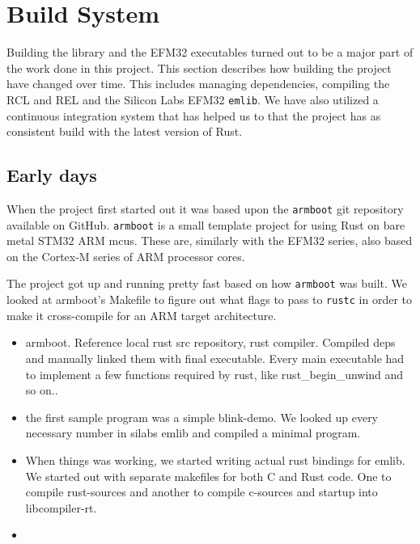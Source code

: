 \section{Build System}
\label{sec:build_system}

Building the library and the EFM32 executables turned out to be a major part of the work done in this project.
This section describes how building the project have changed over time.
This includes managing dependencies, compiling the RCL and REL and the Silicon Labs EFM32 \texttt{emlib}.
We have also utilized a continuous integration system that has helped us to that the project has as consistent build with the latest version of Rust.

\subsection{Early days}
\label{ssub:using_make}

When the project first started out it was based upon the \texttt{armboot} \cite{web:neykov_armboot} git repository available on GitHub.
\texttt{armboot} is a small template project for using Rust on bare metal STM32 ARM \glspl{mcu}.
These are, similarly with the EFM32 series, also based on the Cortex-M series of ARM processor cores.

The project got up and running pretty fast based on how \texttt{armboot} was built.
We looked at armboot's Makefile to figure out what flags to pass to \texttt{rustc} in order to make it cross-compile for an ARM target architecture.

\begin{itemize}
    \item armboot. Reference local rust src repository, rust compiler. Compiled deps and manually linked them with final executable. Every main executable had to implement a few functions required by rust, like rust_begin_unwind and so on..

    \item the first sample program was a simple blink-demo. We looked up every necessary number in silabs emlib and compiled a minimal program.

    \item When things was working, we started writing actual rust bindings for emlib. We started out with separate makefiles for both C and Rust code. One to compile rust-sources and another to compile c-sources and startup into libcompiler-rt.

    \item
\end{itemize}
